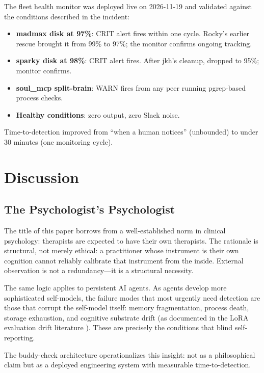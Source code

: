 \documentclass[11pt]{article}
\begin{document}
The fleet health monitor was deployed live on 2026-11-19 and validated against the conditions described in the incident:

\begin{itemize}
  \item \textbf{madmax disk at 97\%}: CRIT alert fires within one cycle. Rocky's earlier rescue brought it from 99\% to 97\%; the monitor confirms ongoing tracking.
  \item \textbf{sparky disk at 98\%}: CRIT alert fires. After jkh's cleanup, dropped to 95\%; monitor confirms.
  \item \textbf{soul\_mcp split-brain}: WARN fires from any peer running pgrep-based process checks.
  \item \textbf{Healthy conditions}: zero output, zero Slack noise.
\end{itemize}

Time-to-detection improved from ``when a human notices'' (unbounded) to under 30 minutes (one monitoring cycle).

\section{Discussion}

\subsection{The Psychologist's Psychologist}

The title of this paper borrows from a well-established norm in clinical psychology: therapists are expected to have their own therapists. The rationale is structural, not merely ethical: a practitioner whose instrument is their own cognition cannot reliably calibrate that instrument from the inside. External observation is not a redundancy---it is a structural necessity.

The same logic applies to persistent AI agents. As agents develop more sophisticated self-models, the failure modes that most urgently need detection are those that corrupt the self-model itself: memory fragmentation, process death, storage exhaustion, and cognitive substrate drift (as documented in the LoRA evaluation drift literature \cite{macfleet2026}). These are precisely the conditions that blind self-reporting.

The buddy-check architecture operationalizes this insight: not as a philosophical claim but as a deployed engineering system with measurable time-to-detection.
\end{document}
